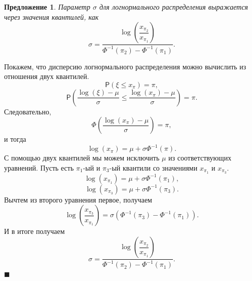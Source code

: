 \documentclass[12pt]{article}
\newtheorem{proposition}[theorem]{Предложение}
\newenvironment{Proof}{\par\noindent{\bf Доказательство.}}{\hfill$\scriptstyle\blacksquare$}
\begin{document}
\begin{proposition}\label{pr3}
	Параметр $\sigma$ для логнормального распределения выражается через значения квантилей, как
	\begin{equation}
		\displaystyle{\sigma = \dfrac{\log\left(\dfrac{x_{\pi_{2}}}{x_{\pi_{1}}}\right)}{\Phi ^{-1}(\pi_{2}) - \Phi ^{-1}(\pi_{1})}}.
	\end{equation} \label{13}
\end{proposition}
\begin{Proof}
	Покажем, что дисперсию логнормального распределения можно вычислить из отношения двух квантилей.
	\begin{equation*}
		\mathsf{P}(\xi\leq x_{\pi}) = \pi,
	\end{equation*}
	\begin{equation*}
		\displaystyle{\mathsf{P}\left(\frac{\log(\xi)-\mu }{\sigma }\leq \frac{\log(x_{\pi})-\mu}{\sigma}\right) = \pi}.
	\end{equation*}
	Следовательно,
	\begin{equation*}
		\displaystyle{\Phi \left(\frac{\log(x_{\pi})-\mu}{\sigma}\right)=\pi},
	\end{equation*}
	и тогда
	\begin{equation}
		\log(x_{\pi})=\mu + \sigma\Phi ^{-1}(\pi).
	\end{equation}
	С помощью двух квантилей мы можем исключить $\mu$ из соответствующих уравнений. Пусть есть $\pi_{1}$-ый и $\pi_{3}$-ый квантили со значениями $x_{\pi_{1}}$ и $x_{\pi_{3}}$.
	\begin{equation*}
		\log(x_{\pi_{1}}) = \mu + \sigma\Phi ^{-1}(\pi_{1}),
	\end{equation*}
	\begin{equation*}
		\log(x_{\pi_{3}}) = \mu + \sigma\Phi ^{-1}(\pi_{3}).
	\end{equation*}
	Вычтем из второго уравнения первое, получаем
	\begin{equation*}
		\log\left(\frac{x_{\pi_{3}}}{x_{\pi_{1}}}\right) = \sigma(\Phi ^{-1}(\pi_{3})-\Phi ^{-1}(\pi_{1})).
	\end{equation*}
	И в итоге получаем
	\begin{equation*}
		\displaystyle{\sigma = \dfrac{\log\left(\dfrac{x_{\pi_{2}}}{x_{\pi_{1}}}\right)}{\Phi ^{-1}(\pi_{2}) - \Phi ^{-1}(\pi_{1})}}.
	\end{equation*}
\end{Proof}
	
\end{document}
